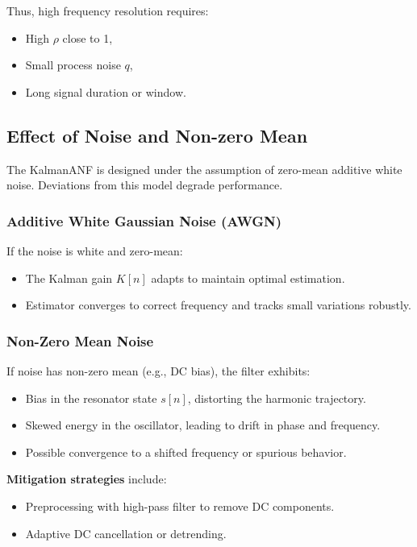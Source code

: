 \documentclass{article}
\begin{document}
Thus, high frequency resolution requires:
\begin{itemize}
    \item High \(\rho\) close to 1,
    \item Small process noise \(q\),
    \item Long signal duration or window.
\end{itemize}

\subsection{Effect of Noise and Non-zero Mean}

The KalmanANF is designed under the assumption of zero-mean additive white noise. Deviations from this model degrade performance.

\subsubsection*{Additive White Gaussian Noise (AWGN)}
If the noise is white and zero-mean:
\begin{itemize}
    \item The Kalman gain \(K[n]\) adapts to maintain optimal estimation.
    \item Estimator converges to correct frequency and tracks small variations robustly.
\end{itemize}

\subsubsection*{Non-Zero Mean Noise}
If noise has non-zero mean (e.g., DC bias), the filter exhibits:
\begin{itemize}
    \item Bias in the resonator state \(s[n]\), distorting the harmonic trajectory.
    \item Skewed energy in the oscillator, leading to drift in phase and frequency.
    \item Possible convergence to a shifted frequency or spurious behavior.
\end{itemize}

\textbf{Mitigation strategies} include:
\begin{itemize}
    \item Preprocessing with high-pass filter to remove DC components.
    \item Adaptive DC cancellation or detrending.
\end{itemize}
\end{document}
